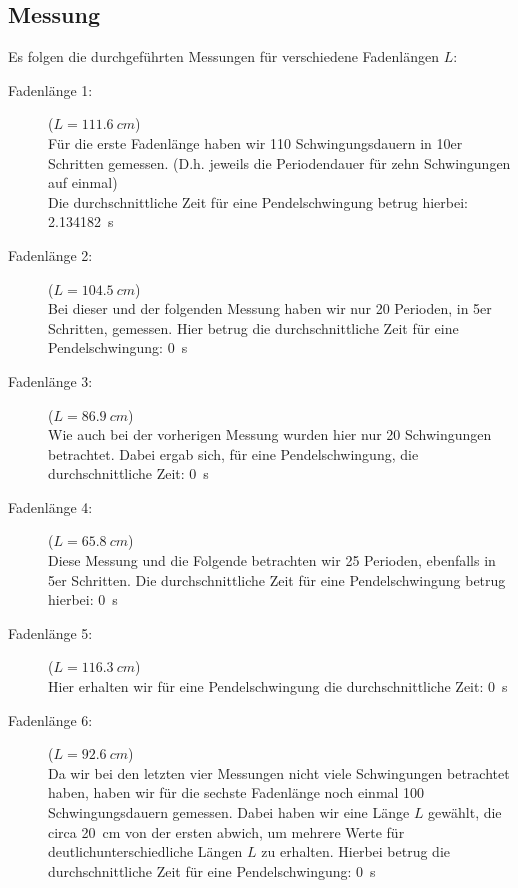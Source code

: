 \documentclass[11pt,a4paper,titlepage, ngerman]{article}
\begin{document}
		
		\subsection{Messung}
		\label{Messung}
			Es folgen die durchgeführten Messungen für verschiedene Fadenlängen $L$: 
			\vspace{0.25cm} 
			
			\begin{description}
				
				\item[Fadenlänge 1:]($L = \SI{111,6}{cm}$)\\
				Für die erste Fadenlänge haben wir 110 Schwingungsdauern in 10er Schritten gemessen. (D.h. jeweils die Periodendauer für zehn Schwingungen auf einmal) \\
				Die durchschnittliche Zeit für eine Pendelschwingung betrug hierbei: \SI{2.134182}{s}
				
				\item[Fadenlänge 2:]($L = \SI{104,5}{cm}$)\\ 				 
				Bei dieser und der folgenden Messung haben wir nur 20 Perioden, in 5er Schritten, gemessen. Hier betrug die durchschnittliche Zeit für eine Pendelschwingung: \SI{0}{s}
				
				\item[Fadenlänge 3:]($L = \SI{86,9}{cm}$)\\ 			
				Wie auch bei der vorherigen Messung wurden hier nur 20 Schwingungen betrachtet. Dabei ergab sich, für eine Pendelschwingung, die durchschnittliche Zeit: \SI{0}{s}		
				
				\item[Fadenlänge 4:]($L = \SI{65,8}{cm}$)\\ 				
				Diese Messung und die Folgende betrachten wir 25 Perioden, ebenfalls in 5er Schritten. Die durchschnittliche Zeit für eine Pendelschwingung betrug hierbei: \SI{0}{s}
				
				\item[Fadenlänge 5:]($L = \SI{116,3}{cm}$)\\ 				
				Hier erhalten wir für eine Pendelschwingung die durchschnittliche Zeit: \SI{0}{s}
				
				\item[Fadenlänge 6:]($L = \SI{92,6}{cm}$)\\ 				
				Da wir bei den letzten vier Messungen nicht viele Schwingungen betrachtet haben, haben wir für die sechste Fadenlänge noch einmal 100 Schwingungsdauern gemessen. Dabei haben wir eine Länge $L$ gewählt, die circa \SI{20}{cm} von der ersten abwich, um mehrere Werte für \glqq deutlich\grqq unterschiedliche Längen $L$ zu erhalten. 
				Hierbei betrug die durchschnittliche Zeit für eine Pendelschwingung: \SI{0}{s}
				
			\end{description}
		
\end{document}
